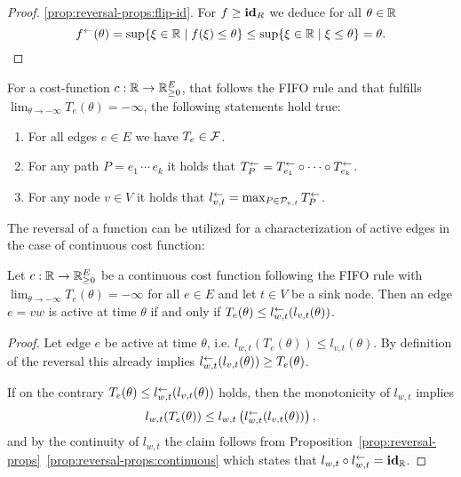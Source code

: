 \begin{proof}
    \ref{prop:reversal-props:flip-id}.
    For $f\geq \mathbf{id}_R$ we deduce for all $\theta\in\mathbb{R}$ \[
        f^{\leftarrow}(\theta) = \sup\{ \xi\in\mathbb{R} \mid f(\xi) \leq \theta \}
        \leq \sup\{\xi\in\mathbb{R} \mid \xi \leq \theta \} = \theta. \qedhere
    \]
\end{proof}

\begin{corollary}
    For a cost-function $c:\mathbb{R}\rightarrow\mathbb{R}_{\geq0}^E$, that follows the FIFO rule and that fulfills $\lim_{\theta\to-\infty} T_e(\theta) = -\infty$, the following statements hold true:
    \begin{enumerate}[label=(\roman*)]
        \item For all edges $e\in E$ we have $T_e \in \mathcal{F}$.
        \item\label{prop:reversal-props:paths} For any path $P=e_1\,\cdots \,e_k$ it holds that $T_P^{\leftarrow} = T_{e_1}^{\leftarrow} \circ \cdots \circ T_{e_k}^{\leftarrow}$.
        \item For any node $v\in V$ it holds that $l_{v,t}^{\leftarrow} = \max_{P\in\mathcal{P}_{v,t}} T_P^{\leftarrow}$.
    \end{enumerate}
\end{corollary}

The reversal of a function can be utilized for a characterization of active edges in the case of continuous cost function:

\begin{lemma}\label{lem:characterization-active-edges}
    Let $c: \mathbb{R}\rightarrow\mathbb{R}_{\geq0}^E$ be a continuous cost function following the FIFO rule with $\lim_{\theta\to-\infty} T_e(\theta) = -\infty$ for all $e\in E$ and let $t\in V$ be a sink node.
    Then an edge $e=vw$ is active at time $\theta$ if and only if $T_e(\theta) \leq l_{w,t}^{\leftarrow}( l_{v,t}(\theta) )$.
\end{lemma}
\begin{proof}
    Let edge $e$ be active at time $\theta$, i.e. $l_{w,t}(T_e(\theta)) \leq l_{v,t}(\theta)$.
    By definition of the reversal this already implies $l_{w,t}^{\leftarrow}(l_{v,t}(\theta)) \geq T_e(\theta)$.

    If on the contrary $T_e(\theta) \leq l_{w,t}^{\leftarrow}( l_{v,t}(\theta) )$ holds, then the monotonicity of $l_{w,t}$ implies 
    \[
        l_{w,t}( T_e(\theta) ) \leq l_{w,t}\left(l_{w,t}^{\leftarrow}(l_{v,t}(\theta))\right),
    \]
    and by the continuity of $l_{w,t}$ the claim follows from Proposition~\ref{prop:reversal-props}~\ref{prop:reversal-props:continuous} which states that $l_{w,t} \circ l_{w,t}^{\leftarrow} = \mathbf{id}_{\mathbb{R}}$. 
\end{proof}